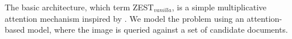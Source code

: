 \documentclass[11pt,a4paper]{article}
\begin{document}
The basic architecture, which term ZEST$_{vanilla}$, is a simple multiplicative attention mechanism \cite{luong2015effective} inspired by \citet{romera2015embarrassingly}. We model the problem using an attention-based model, where the image is queried
against a set of candidate documents.







\end{document}
